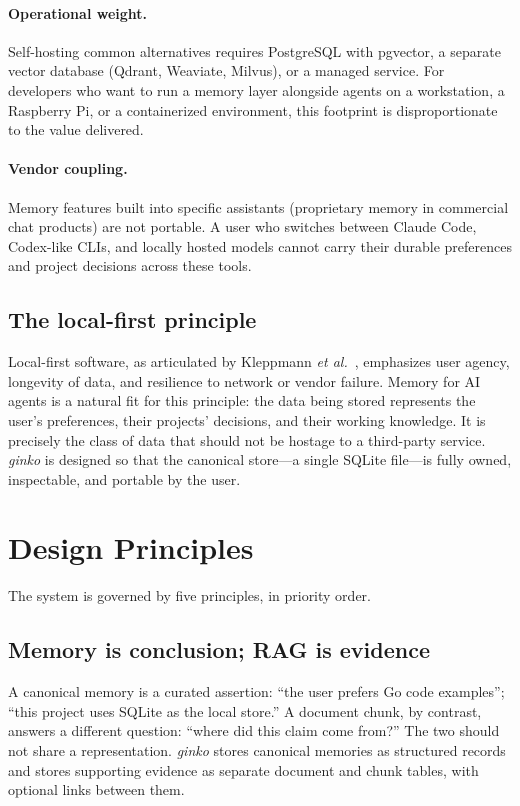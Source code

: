 \documentclass[11pt,a4paper]{article}
\begin{document}
\paragraph{Operational weight.} Self-hosting common alternatives requires PostgreSQL with pgvector, a separate vector database (Qdrant, Weaviate, Milvus), or a managed service. For developers who want to run a memory layer alongside agents on a workstation, a Raspberry Pi, or a containerized environment, this footprint is disproportionate to the value delivered.

\paragraph{Vendor coupling.} Memory features built into specific assistants (proprietary memory in commercial chat products) are not portable. A user who switches between Claude Code, Codex-like CLIs, and locally hosted models cannot carry their durable preferences and project decisions across these tools.

\subsection{The local-first principle}

Local-first software, as articulated by Kleppmann \textit{et al.}~\cite{kleppmann2019localfirst}, emphasizes user agency, longevity of data, and resilience to network or vendor failure. Memory for AI agents is a natural fit for this principle: the data being stored represents the user's preferences, their projects' decisions, and their working knowledge. It is precisely the class of data that should not be hostage to a third-party service. \textit{ginko} is designed so that the canonical store---a single SQLite file---is fully owned, inspectable, and portable by the user.

\section{Design Principles}

The system is governed by five principles, in priority order.

\subsection{Memory is conclusion; RAG is evidence}

A canonical memory is a curated assertion: ``the user prefers Go code examples''; ``this project uses SQLite as the local store.'' A document chunk, by contrast, answers a different question: ``where did this claim come from?'' The two should not share a representation. \textit{ginko} stores canonical memories as structured records and stores supporting evidence as separate document and chunk tables, with optional links between them.
\end{document}

